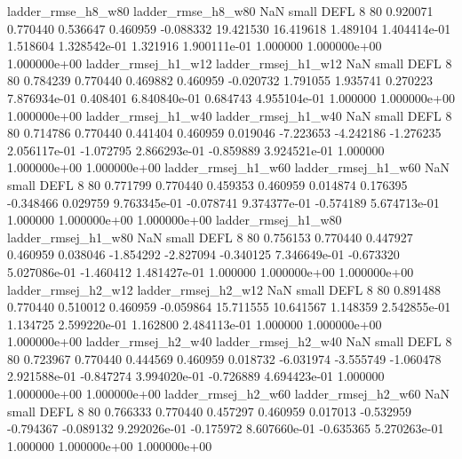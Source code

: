       ladder_rmse_h8_w80       ladder_rmse_h8_w80                   NaN      small     DEFL                 8 80 0.920071       0.770440 0.536647       0.460959   -0.088332     19.421530     16.419618     1.489104   1.404414e-01  1.518604 1.328542e-01     1.321916   1.900111e-01            1.000000    1.000000e+00        1.000000e+00
     ladder_rmsej_h1_w12      ladder_rmsej_h1_w12                   NaN      small     DEFL                 8 80 0.784239       0.770440 0.469882       0.460959   -0.020732      1.791055      1.935741     0.270223   7.876934e-01  0.408401 6.840840e-01     0.684743   4.955104e-01            1.000000    1.000000e+00        1.000000e+00
     ladder_rmsej_h1_w40      ladder_rmsej_h1_w40                   NaN      small     DEFL                 8 80 0.714786       0.770440 0.441404       0.460959    0.019046     -7.223653     -4.242186    -1.276235   2.056117e-01 -1.072795 2.866293e-01    -0.859889   3.924521e-01            1.000000    1.000000e+00        1.000000e+00
     ladder_rmsej_h1_w60      ladder_rmsej_h1_w60                   NaN      small     DEFL                 8 80 0.771799       0.770440 0.459353       0.460959    0.014874      0.176395     -0.348466     0.029759   9.763345e-01 -0.078741 9.374377e-01    -0.574189   5.674713e-01            1.000000    1.000000e+00        1.000000e+00
     ladder_rmsej_h1_w80      ladder_rmsej_h1_w80                   NaN      small     DEFL                 8 80 0.756153       0.770440 0.447927       0.460959    0.038046     -1.854292     -2.827094    -0.340125   7.346649e-01 -0.673320 5.027086e-01    -1.460412   1.481427e-01            1.000000    1.000000e+00        1.000000e+00
     ladder_rmsej_h2_w12      ladder_rmsej_h2_w12                   NaN      small     DEFL                 8 80 0.891488       0.770440 0.510012       0.460959   -0.059864     15.711555     10.641567     1.148359   2.542855e-01  1.134725 2.599220e-01     1.162800   2.484113e-01            1.000000    1.000000e+00        1.000000e+00
     ladder_rmsej_h2_w40      ladder_rmsej_h2_w40                   NaN      small     DEFL                 8 80 0.723967       0.770440 0.444569       0.460959    0.018732     -6.031974     -3.555749    -1.060478   2.921588e-01 -0.847274 3.994020e-01    -0.726889   4.694423e-01            1.000000    1.000000e+00        1.000000e+00
     ladder_rmsej_h2_w60      ladder_rmsej_h2_w60                   NaN      small     DEFL                 8 80 0.766333       0.770440 0.457297       0.460959    0.017013     -0.532959     -0.794367    -0.089132   9.292026e-01 -0.175972 8.607660e-01    -0.635365   5.270263e-01            1.000000    1.000000e+00        1.000000e+00
